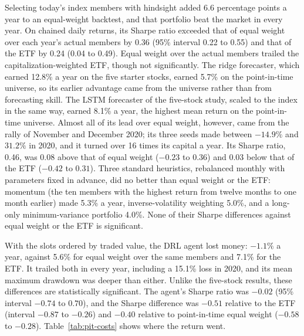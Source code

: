 Selecting today's index members with hindsight added 6.6 percentage points a year to an equal-weight
backtest, and that portfolio beat the market in every year. On chained daily returns, its Sharpe ratio
exceeded that of equal weight over each year's actual members by 0.36 (95\% interval 0.22 to 0.55) and
that of the ETF by 0.24 (0.04 to 0.49). Equal weight over the actual members trailed the
capitalization-weighted ETF, though not significantly.
The ridge forecaster, which earned 12.8\% a year on the five starter stocks, earned 5.7\% on the
point-in-time universe, so its earlier advantage came from the universe rather than from forecasting
skill. The LSTM forecaster of the five-stock study, scaled to the index in the same way, earned 8.1\% a year,
the highest mean return on the point-in-time universe. Almost all of its lead over equal weight, however,
came from the rally of November and December 2020; its three seeds made between $-14.9\%$ and $31.2\%$ in
2020, and it turned over 16 times its capital a year. Its Sharpe ratio, 0.46, was 0.08 above that of equal
weight ($-0.23$ to $0.36$) and 0.03 below that of the ETF ($-0.42$ to $0.31$). Three standard heuristics, rebalanced monthly with parameters fixed in advance, did no better than
equal weight or the ETF:
momentum (the ten members with the highest return from twelve months to one month earlier) made 5.3\%
a year, inverse-volatility weighting 5.0\%, and a long-only minimum-variance portfolio 4.0\%. None of
their Sharpe differences against equal weight or the ETF is significant.

With the slots ordered by traded value, the DRL agent lost money: $-1.1\%$ a year, against 5.6\% for equal weight over the same members and
7.1\% for the ETF. It trailed both in every year, including a 15.1\% loss in 2020, and its mean maximum
drawdown was deeper than either. Unlike the five-stock results, these differences are statistically
significant. The agent's Sharpe ratio was $-0.02$ (95\% interval $-0.74$ to $0.70$), and the Sharpe
difference was $-0.51$ relative to the ETF (interval $-0.87$ to $-0.26$) and $-0.40$ relative to
point-in-time equal weight ($-0.58$ to $-0.28$). Table~\ref{tab:pit-costs} shows where the return went.


